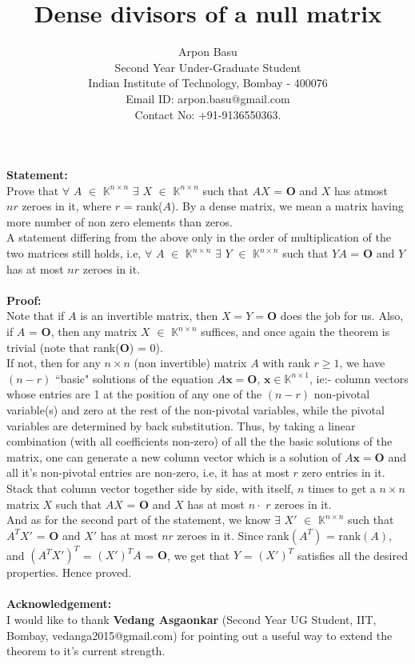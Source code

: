 \documentclass{article}
\title{\textbf{Dense divisors of a null matrix}}
\author{ Arpon Basu \\ Second Year Under-Graduate Student \\
Indian Institute of Technology, Bombay - 400076\\
    Email ID: arpon.basu@gmail.com \\
    Contact No: +91-9136550363.
}
\date{}
\begin{document}
\maketitle
\noindent
{\bf Statement:}\\ 
Prove that $\forall$ $A$ $\in$ $\mathbb{K}^{n\times n}$ $\exists$ $X$ $\in$ $\mathbb{K}^{n\times n}$ such that $AX$ = $\textbf{O}$ and $X$ has atmost \\
$nr$ zeroes in it, where $r$ = rank($A$). By a dense matrix, we mean a matrix having more number of non zero elements than zeros.\\
A statement differing from the above only in the order of multiplication of the two matrices still holds, i.e, $\forall$ $A$ $\in$ $\mathbb{K}^{n\times n}$ $\exists$ $Y$ $\in$ $\mathbb{K}^{n\times n}$ such that $YA$ = $\textbf{O}$ and $Y$ has at most $n r$ zeroes in it. \\ \\
\noindent
{\bf Proof:}\\ 
Note that if $A$ is an invertible matrix, then $X = Y = \textbf{O}$ does the job for us.
Also, if $A$ = $\textbf{O}$, then any matrix $X$ $\in$ $\mathbb{K}^{n\times n}$ suffices, and once again the theorem is trivial (note that rank($\textbf{O}$) = 0).\\
If not, then for any $n\times n$ (non invertible) matrix $A$ with rank $r \geq 1$, we have $(n - r)$ ``basic" solutions of the equation $A\textbf{x} = \textbf{O}$, $\textbf{x} \in \mathbb{K}^{n\times 1}$, ie:- column vectors whose entries are 1 at the position of any one of the $(n - r)$ non-pivotal variable(s) and zero at the rest of the non-pivotal variables, while the pivotal variables are determined by back substitution. Thus, by taking a linear combination (with all coefficients non-zero) of all the the basic solutions of the matrix, one can generate a new column vector which is a solution of $A\textbf{x} = \textbf{O}$ and all it's non-pivotal entries are non-zero, i.e, it has at most $r$ zero entries in it. Stack that column vector together side by side, with itself, $n$ times to get a $n\times n$ matrix $X$ such that $AX$ = $\textbf{O}$ and $X$ has at most $n\cdot$ $r$ zeroes in it.\\
And as for the second part of the statement, we know $\exists$ $X'$ $\in$ $\mathbb{K}^{n\times n}$ such that $A^{T}X'$ = $\textbf{O}$ and $X'$ has at most $n r$ zeroes in it. Since rank$(A^{T})$ = rank$(A)$, and $(A^{T}X')^{T}$ = $(X')^{T}A$ = $\textbf{O}$, we get that $Y$ = $(X')^{T}$ satisfies all the desired properties.
Hence proved.\\ \\
\noindent
{\bf Acknowledgement:}\\
I would like to thank \textbf{Vedang Asgaonkar} (Second Year UG Student, IIT, Bombay, vedanga2015@gmail.com) for pointing out a useful way to extend the theorem to it's current strength.

















\end{document}
